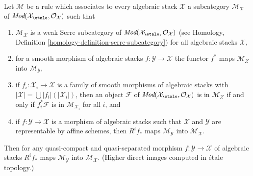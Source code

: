 \begin{lemma}
\label{lemma-general-pushforward}
Let $\mathcal{M}$ be a rule which associates to every algebraic stack
$\mathcal{X}$ a subcategory $\mathcal{M}_\mathcal{X}$ of
$\textit{Mod}(\mathcal{X}_\etale, \mathcal{O}_\mathcal{X})$
such that
\begin{enumerate}
\item $\mathcal{M}_\mathcal{X}$ is a weak Serre subcategory
of $\textit{Mod}(\mathcal{X}_\etale, \mathcal{O}_\mathcal{X})$
(see Homology, Definition \ref{homology-definition-serre-subcategory})
for all algebraic stacks $\mathcal{X}$,
\item for a smooth morphism of algebraic stacks
$f : \mathcal{Y} \to \mathcal{X}$ the functor $f^*$ maps
$\mathcal{M}_\mathcal{X}$ into $\mathcal{M}_\mathcal{Y}$,
\item if $f_i : \mathcal{X}_i \to \mathcal{X}$ is a family of smooth
morphisms of algebraic stacks with
$|\mathcal{X}| = \bigcup |f_i|(|\mathcal{X}_i|)$, then an object
$\mathcal{F}$ of
$\textit{Mod}(\mathcal{X}_\etale, \mathcal{O}_\mathcal{X})$
is in $\mathcal{M}_\mathcal{X}$ if and only if
$f_i^*\mathcal{F}$ is in $\mathcal{M}_{\mathcal{X}_i}$ for all $i$, and
\item if $f : \mathcal{Y} \to \mathcal{X}$ is a morphism of algebraic
stacks such that $\mathcal{X}$ and $\mathcal{Y}$ are representable
by affine schemes, then $R^if_*$ maps $\mathcal{M}_\mathcal{Y}$
into $\mathcal{M}_\mathcal{X}$.
\end{enumerate}
Then for any quasi-compact and quasi-separated morphism 
$f : \mathcal{Y} \to \mathcal{X}$ of algebraic stacks
$R^if_*$ maps $\mathcal{M}_\mathcal{Y}$
into $\mathcal{M}_\mathcal{X}$. (Higher direct images computed in \'etale
topology.)
\end{lemma}


